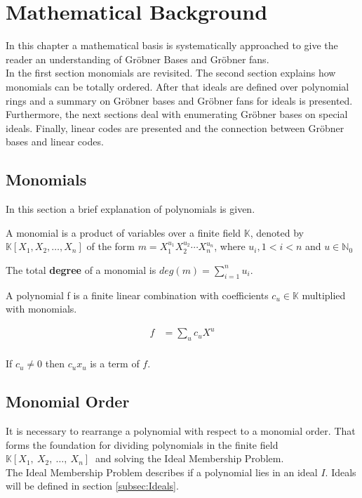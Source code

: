 \section{Mathematical Background}
\label{sec:background}

In this chapter a mathematical basis is systematically approached to give the reader an understanding of Gröbner Bases and Gröbner fans.\\
In the first section monomials are revisited. The second section explains how monomials can be totally ordered.
After that ideals are defined over polynomial rings and a summary on Gröbner bases and Gröbner fans for ideals is presented. Furthermore, the next sections deal with enumerating Gröbner bases on special ideals. Finally, linear codes are presented and the connection between Gröbner bases and linear codes.  

\subsection{Monomials}
\label{subseb:Monomials}

In this section a brief explanation of polynomials is given.

\begin{env_definition}[Monomial] 
\cite{KHZ}
A monomial is a product of variables over a finite field $\mathbb{K}$, denoted by $ \mathbb{K} \left[X_{1},X_{2},\dots, X_{n}\right]  $ of the form $m= X_{1}^{u_{1}}X_{2}^{u_{2}}\cdots X_{n}^{u_{n}}$, where $u_{i}, 1 < i < n $ and $u \in \mathbb{N}_{0} $
\end{env_definition}
The total \textbf{degree} of a monomial is $deg(m) = \sum_{i=1}^n u_i $. 


\begin{env_definition}[Polynomial]
\cite{KHZ}
A polynomial f is a finite linear combination with coefficients $c_{u} \in \mathbb{K}$ multiplied with monomials.


\begin{align*}
	f &= \sum_{u} c_{u}X^{u} \\
\end{align*}

\end{env_definition}
If $c_{u}\neq0$ then $c_{u}x_{u}$ is a term of $f$.





\subsection{Monomial Order}
\label{subsec:Monomialorder}
It is necessary to rearrange a polynomial with respect to a monomial order. That forms the foundation for dividing polynomials in the finite field
$ \mathbb{K} \left[X_{1},~X_{2},~\dots,~X_{n}\right]~$ and solving the Ideal Membership Problem.\\
The Ideal Membership Problem describes if a polynomial lies in an ideal $I$. Ideals will be defined in section \ref{subsec:Ideals}.

